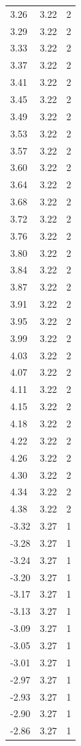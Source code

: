 \begin{longtable}{lrr}
  3.26 & 3.22 & 2 \\
  3.29 & 3.22 & 2 \\
  3.33 & 3.22 & 2 \\
  3.37 & 3.22 & 2 \\
  3.41 & 3.22 & 2 \\
  3.45 & 3.22 & 2 \\
  3.49 & 3.22 & 2 \\
  3.53 & 3.22 & 2 \\
  3.57 & 3.22 & 2 \\
  3.60 & 3.22 & 2 \\
  3.64 & 3.22 & 2 \\
  3.68 & 3.22 & 2 \\
  3.72 & 3.22 & 2 \\
  3.76 & 3.22 & 2 \\
  3.80 & 3.22 & 2 \\
  3.84 & 3.22 & 2 \\
  3.87 & 3.22 & 2 \\
  3.91 & 3.22 & 2 \\
  3.95 & 3.22 & 2 \\
  3.99 & 3.22 & 2 \\
  4.03 & 3.22 & 2 \\
  4.07 & 3.22 & 2 \\
  4.11 & 3.22 & 2 \\
  4.15 & 3.22 & 2 \\
  4.18 & 3.22 & 2 \\
  4.22 & 3.22 & 2 \\
  4.26 & 3.22 & 2 \\
  4.30 & 3.22 & 2 \\
  4.34 & 3.22 & 2 \\
  4.38 & 3.22 & 2 \\
  -3.32 & 3.27 & 1 \\
  -3.28 & 3.27 & 1 \\
  -3.24 & 3.27 & 1 \\
  -3.20 & 3.27 & 1 \\
  -3.17 & 3.27 & 1 \\
  -3.13 & 3.27 & 1 \\
  -3.09 & 3.27 & 1 \\
  -3.05 & 3.27 & 1 \\
  -3.01 & 3.27 & 1 \\
  -2.97 & 3.27 & 1 \\
  -2.93 & 3.27 & 1 \\
  -2.90 & 3.27 & 1 \\
  -2.86 & 3.27 & 1 \\

\end{longtable}
